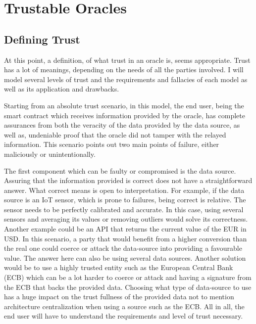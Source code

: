 \chapter{Trustable Oracles }\label{chap:chap5}

\section*{}



\section{Defining Trust}

At this point, a definition, of what trust in an oracle is, seems appropriate. Trust has a lot of meanings, depending on the needs of all the parties involved. I will model several levels of trust and the requirements and fallacies of each model as well as its application and drawbacks.

Starting from an absolute trust scenario, in this model, the end user, being the smart contract which receives information provided by the oracle, has complete assurances from both the veracity of the data provided by the data source, as well as, undeniable proof that the oracle did not tamper with the relayed information. This scenario points out two main points of failure, either maliciously or unintentionally.

The first component which can be faulty or compromised is the data source. Assuring that the information provided is correct does not have a straightforward answer. What correct means is open to interpretation. For example, if the data source is an IoT sensor, which is prone to failures, being correct is relative. The sensor needs to be perfectly calibrated and accurate. In this case, using several sensors and averaging its values or removing outliers would solve its correctness. Another example could be an API that returns the current value of the EUR in USD. In this scenario, a party that would benefit from a higher conversion than the real one could coerce or attack the data-source into providing a favourable value. The answer here can also be using several data sources. Another solution would be to use a highly trusted entity such as the European Central Bank (ECB) which can be a lot harder to coerce or attack and having a signature from the ECB that backs the provided data. Choosing what type of data-source to use has a huge impact on the trust fullness of the provided data not to mention architecture centralization when using a source such as the ECB. All in all, the end user will have to understand the requirements and level of trust necessary.

